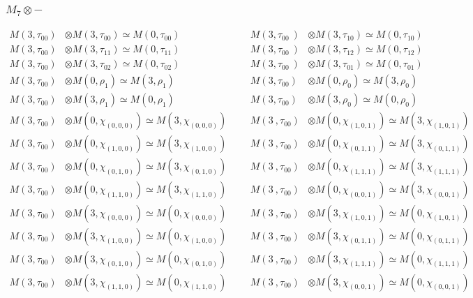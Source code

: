 \subsubsection{$M_7\otimes -$}
\begin{align*}
M(3,\tau_{00}) &\otimes M(3,\tau_{00}) \simeq M(0,\tau_{00}) &&& M(3,\tau_{00}\
) &\otimes M(3,\tau_{10}) \simeq M(0,\tau_{10})\\
M(3,\tau_{00}) &\otimes M(3,\tau_{11}) \simeq M(0,\tau_{11}) &&& M(3,\tau_{00}\
) &\otimes M(3,\tau_{12}) \simeq M(0,\tau_{12})\\
M(3,\tau_{00}) &\otimes M(3,\tau_{02}) \simeq M(0,\tau_{02}) &&& M(3,\tau_{00}\
) &\otimes M(3,\tau_{01}) \simeq M(0,\tau_{01})\\
M(3,\tau_{00}) &\otimes M(0,\rho_{1}) \simeq M(3,\rho_{1}) &&& M(3,\tau_{00}) \
&\otimes M(0,\rho_{0}) \simeq M(3,\rho_{0})\\
M(3,\tau_{00}) &\otimes M(3,\rho_{1}) \simeq M(0,\rho_{1}) &&& M(3,\tau_{00}) \
&\otimes M(3,\rho_{0}) \simeq M(0,\rho_{0})\\
M(3,\tau_{00}) &\otimes M(0,\chi_{(0,0,0)}) \simeq M(3,\chi_{(0,0,0)}) &&& M(3\
,\tau_{00}) &\otimes M(0,\chi_{(1,0,1)}) \simeq M(3,\chi_{(1,0,1)})\\
M(3,\tau_{00}) &\otimes M(0,\chi_{(1,0,0)}) \simeq M(3,\chi_{(1,0,0)}) &&& M(3\
,\tau_{00}) &\otimes M(0,\chi_{(0,1,1)}) \simeq M(3,\chi_{(0,1,1)})\\
M(3,\tau_{00}) &\otimes M(0,\chi_{(0,1,0)}) \simeq M(3,\chi_{(0,1,0)}) &&& M(3\
,\tau_{00}) &\otimes M(0,\chi_{(1,1,1)}) \simeq M(3,\chi_{(1,1,1)})\\
M(3,\tau_{00}) &\otimes M(0,\chi_{(1,1,0)}) \simeq M(3,\chi_{(1,1,0)}) &&& M(3\
,\tau_{00}) &\otimes M(0,\chi_{(0,0,1)}) \simeq M(3,\chi_{(0,0,1)})\\
M(3,\tau_{00}) &\otimes M(3,\chi_{(0,0,0)}) \simeq M(0,\chi_{(0,0,0)}) &&& M(3\
,\tau_{00}) &\otimes M(3,\chi_{(1,0,1)}) \simeq M(0,\chi_{(1,0,1)})\\
M(3,\tau_{00}) &\otimes M(3,\chi_{(1,0,0)}) \simeq M(0,\chi_{(1,0,0)}) &&& M(3\
,\tau_{00}) &\otimes M(3,\chi_{(0,1,1)}) \simeq M(0,\chi_{(0,1,1)})\\
M(3,\tau_{00}) &\otimes M(3,\chi_{(0,1,0)}) \simeq M(0,\chi_{(0,1,0)}) &&& M(3\
,\tau_{00}) &\otimes M(3,\chi_{(1,1,1)}) \simeq M(0,\chi_{(1,1,1)})\\
M(3,\tau_{00}) &\otimes M(3,\chi_{(1,1,0)}) \simeq M(0,\chi_{(1,1,0)}) &&& M(3\
,\tau_{00}) &\otimes M(3,\chi_{(0,0,1)}) \simeq M(0,\chi_{(0,0,1)})\\

\end{align*}
